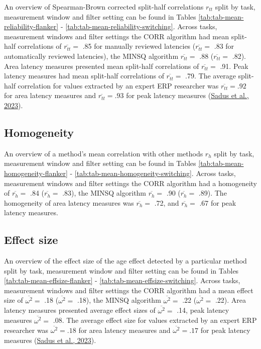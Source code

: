 \documentclass[
  man]{apa7}
\begin{document}
An overview of Spearman-Brown corrected split-half correlations \(r_{tt}\) split by task, measurement window and filter setting can be found in Tables \ref{tab:tab-mean-reliability-flanker} - \ref{tab:tab-mean-reliability-switching}. Across tasks, measurement windows and filter settings the CORR algorithm had mean split-half correlations of \(\overline{r_{tt}} =\) .85 for manually reviewed latencies (\(\overline{r_{tt}} =\) .83 for automatically reviewed latencies), the MINSQ algorithm \(\overline{r_{tt}} =\) .88 (\(\overline{r_{tt}} =\) .82). Area latency measures presented mean split-half correlations of \(\overline{r_{tt}} =\) .91. Peak latency measures had mean split-half correlations of \(\overline{r_{tt}} =\) .79. The average split-half correlation for values extracted by an expert ERP researcher was \(\overline{r_{tt}} = .92\) for area latency measures and \(\overline{r_{tt}} = .93\) for peak latency measures (\protect\hyperlink{ref-sadus2023multiverse}{Sadus et al., 2023}).

\hypertarget{homogeneity}{%
\subsection{Homogeneity}\label{homogeneity}}

An overview of a method's mean correlation with other methods \(r_h\) split by task, measurement window and filter setting can be found in Tables \ref{tab:tab-mean-homogeneity-flanker} - \ref{tab:tab-mean-homogeneity-switching}. Across tasks, measurement windows and filter settings the CORR algorithm had a homogeneity of \(\overline{r_{h}} =\) .84 (\(\overline{r_{h}} =\) .83), the MINSQ algorithm \(\overline{r_{h}} =\) .90 (\(\overline{r_{h}} =\) .89). The homogeneity of area latency measures was \(\overline{r_{h}} =\) .72, and \(\overline{r_{h}} =\) .67 for peak latency measures.

\hypertarget{effect-size}{%
\subsection{Effect size}\label{effect-size}}

An overview of the effect size of the age effect detected by a particular method split by task, measurement window and filter setting can be found in Tables \ref{tab:tab-mean-effsize-flanker} - \ref{tab:tab-mean-effsize-switching}. Across tasks, measurement windows and filter settings the CORR algorithm had a mean effect size of \(\overline{\omega^2} =\) .18 (\(\overline{\omega^2} =\) .18), the MINSQ algorithm \(\overline{\omega^2} =\) .22 (\(\overline{\omega^2} =\) .22). Area latency measures presented average effect sizes of \(\overline{\omega^2} =\) .14, peak latency measures \(\overline{\omega^2} =\) .08. The average effect size for values extracted by an expert ERP researcher was \(\overline{\omega^2} = .18\) for area latency measures and \(\overline{\omega^2} = .17\) for peak latency measures (\protect\hyperlink{ref-sadus2023multiverse}{Sadus et al., 2023}).
\end{document}
